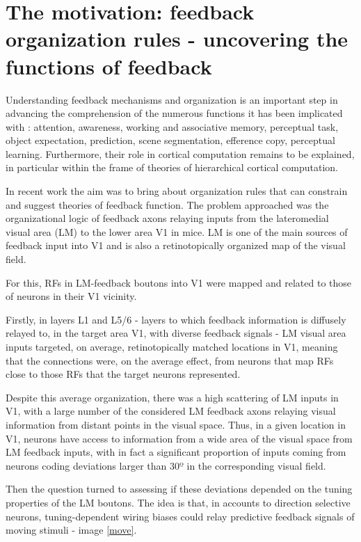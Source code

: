 \section{The motivation: feedback organization rules - uncovering the functions of feedback}
\label{subsec:subcsectionE}

 Understanding feedback mechanisms and organization is an important step in advancing the comprehension of the numerous functions it has been implicated with \cite{TopDown}: attention, awareness, working and associative memory, perceptual task, object expectation, prediction, scene segmentation, efference copy, perceptual learning.
Furthermore, their role in cortical computation remains to be explained, in particular within the frame of theories of hierarchical cortical computation.

In recent work \cite{Tiago} the aim was to bring about organization rules that can constrain and suggest theories of feedback function. 
The problem approached was the organizational logic of feedback axons relaying inputs from the lateromedial visual area (LM) to the lower area V1 in mice. LM is one of the main sources of feedback input into V1 and is also a retinotopically organized map of the visual field.

For this, RFs in LM-feedback boutons into V1 were mapped and related to those of neurons in their V1 vicinity.

Firstly, in layers L1 and L5/6 - layers to which feedback information is diffusely relayed to, in the target area V1, with diverse feedback signals \cite{9Tiago} - LM visual area inputs targeted, on average, retinotopically matched locations in V1, meaning that the connections were, on the average effect, from neurons that map RFs close to those RFs that the target neurons represented. 

Despite this average organization, there was a high scattering of LM inputs in V1, with a large number of the considered LM feedback axons relaying visual information from distant points in the visual space. Thus, in a given location in V1, neurons have access to information from a wide area of the visual space from LM feedback inputs, with in fact a significant proportion of inputs coming from neurons coding deviations larger than $30º$ in the corresponding visual field.

Then the question turned to assessing if these deviations depended on the tuning properties of the LM boutons. The idea is that, in accounts to direction selective neurons, tuning-dependent wiring biases could relay predictive feedback signals of moving stimuli - image \ref{move}.

